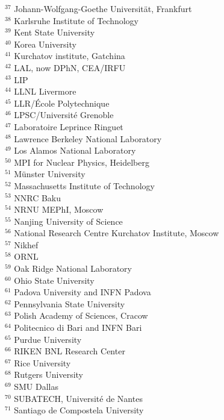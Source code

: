 {$^{37}$ Johann-Wolfgang-Goethe Universit\"{a}t, Frankfurt\\
$^{38}$ Karlsruhe Institute of Technology\\
$^{39}$ Kent State University\\
$^{40}$ Korea University\\
$^{41}$ Kurchatov institute, Gatchina\\
$^{42}$ LAL, now DPhN, CEA/IRFU\\
$^{43}$ LIP\\
$^{44}$ LLNL Livermore\\
$^{45}$ LLR/{\'E}cole Polytechnique\\
$^{46}$ LPSC/Universit{\'e} Grenoble\\
$^{47}$ Laboratoire Leprince Ringuet\\
$^{48}$ Lawrence Berkeley National Laboratory\\
$^{49}$ Los Alamos National Laboratory\\
$^{50}$ MPI for Nuclear Physics, Heidelberg\\
$^{51}$ M\"{u}nster University\\
$^{52}$ Massachusetts Institute of Technology\\
$^{53}$ NNRC Baku\\
$^{54}$ NRNU MEPhI, Moscow\\
$^{55}$ Nanjing University of Science\\
$^{56}$ National Research Centre Kurchatov Institute, Moscow\\
$^{57}$ Nikhef\\
$^{58}$ ORNL\\
$^{59}$ Oak Ridge National Laboratory\\
$^{60}$ Ohio State University\\
$^{61}$ Padova University and INFN Padova\\
$^{62}$ Pennsylvania State University\\
$^{63}$ Polish Academy of Sciences, Cracow\\
$^{64}$ Politecnico di Bari and INFN Bari\\
$^{65}$ Purdue University\\
$^{66}$ RIKEN BNL Research Center\\
$^{67}$ Rice University\\
$^{68}$ Rutgers University\\
$^{69}$ SMU Dallas\\
$^{70}$ SUBATECH, Universit\'e de Nantes\\
$^{71}$ Santiago de Compostela University\\
}

